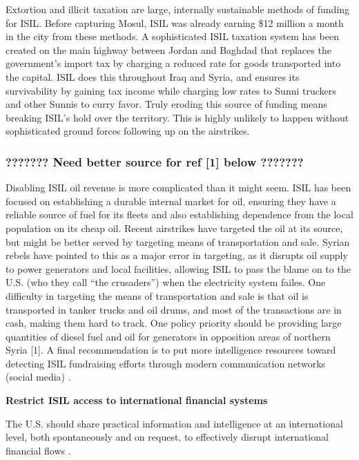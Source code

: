 \documentclass{report}
\begin{document}
Extortion and illicit taxation are large, internally sustainable methods of funding for ISIL. Before capturing Mosul, ISIL was already earning \$12 million a month in the city from these methods. A sophisticated ISIL taxation system has been created on the main highway between Jordan and Baghdad that replaces the government's import tax by charging a reduced rate for goods transported into the capital. ISIL does this throughout Iraq and Syria, and ensures its survivability by gaining tax income while charging low rates to Sunni truckers and other Sunnis to curry favor. Truly eroding this source of funding means breaking ISIL's hold over the territory. This is highly unlikely to happen without sophisticated ground forces following up on the airstrikes. 

\subsubsection{???????  Need better source for ref [1]  below  ???????}


Disabling ISIL oil revenue is more complicated than it might seem. ISIL has been focused on establishing a durable internal market for oil, ensuring they have a reliable source of fuel for its fleets and also establishing dependence from the local population on its cheap oil. Recent airstrikes have targeted the oil at its source, but might be better served by targeting means of transportation and sale. Syrian rebels have pointed to this as a major error in targeting, as it disrupts oil supply to power generators and local facilities, allowing ISIL to pass the blame on to the U.S. (who they call \enquote{the crusaders}) when the electricity system failes. One difficulty in targeting the means of transportation and sale is that oil is transported in tanker trucks and oil drums, and most of the transactions are in cash, making them hard to track. One policy priority should be providing large quantities of diesel fuel and oil for generators in opposition areas of northern Syria [1].
A final recommendation is to put more intelligence resources toward detecting ISIL fundraising efforts through modern communication networks (social media) \cite{Report2015}.

\textbf{Restrict ISIL access to international financial systems}

The U.S. should share practical information and intelligence at an international level, both spontaneously and on request, to effectively disrupt international financial flows \cite{Report2015}.
\end{document}
